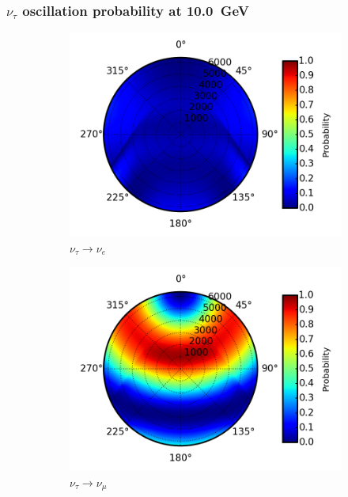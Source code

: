 \documentclass{beamer}
\begin{document}
\begin{frame}
	\frametitle{$\nu_{\tau}$ oscillation probability at \SI{10.0}{GeV}}
	\begin{figure}
		\centering
		\begin{subfigure}[b]{0.33\linewidth}
			\caption{ $\nu_{\tau} \rightarrow \nu_{e}$ }
			\includegraphics[width=\linewidth]{earth_10.0gev_nutau2nue_throughEarth.png}
		\end{subfigure}
		\begin{subfigure}[b]{0.33\linewidth}
			\caption{ $\nu_{\tau} \rightarrow \nu_{\mu}$ }
			\includegraphics[width=\linewidth]{earth_10.0gev_nutau2numu_throughEarth.png}
		\end{subfigure}
		\begin{subfigure}[b]{0.33\linewidth}

\end{subfigure}
\end{figure}
\end{frame}
\end{document}
